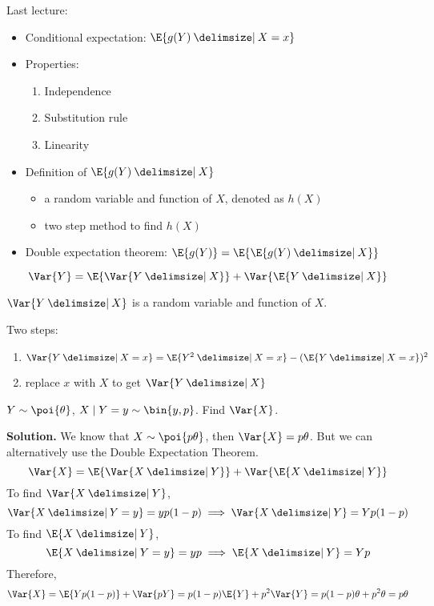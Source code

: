 Last lecture:
\begin{itemize}
    \item Conditional expectation: $ \E{g(Y)\given X=x} $
    \item Properties:
          \begin{enumerate}[label=(\arabic*)]
              \item Independence
              \item Substitution rule
              \item Linearity
          \end{enumerate}
    \item Definition of $ \E{g(Y)\given X} $
          \begin{itemize}
              \item a random variable and function of $ X $, denoted as $ h(X) $
              \item two step method to find $ h(X) $
          \end{itemize}
    \item Double expectation theorem: $ \E{g(Y)}=\E{\E{g(Y)\given X}} $
\end{itemize}
\begin{Theorem}{}{}
    \[ \Var{Y}=\E{\Var{Y\given X}}+\Var{\E{Y\given X}} \]
\end{Theorem}
\begin{Remark}{}{}
    $ \Var{Y\given X} $ is a random variable and function of $ X $.
\end{Remark}
Two steps:
\begin{enumerate}
    \item $ \Var{Y\given X=x}=\E{Y^2\given X=x}-(\E{Y\given X=x})^2 $
    \item replace $ x $ with $ X $ to get $ \Var{Y\given X} $
\end{enumerate}
\begin{Example}{}{}
    $ Y \sim \poi{\theta} $, $ X\mid Y=y \sim \bin{y,p} $. Find
    $ \Var{X} $.

    \textbf{Solution.} We know that $ X \sim \poi{p\theta} $,
    then $ \Var{X}=p\theta $. But we can alternatively
    use the Double Expectation Theorem.
    \[ \Var{X}=\E{\Var{X\given Y}}+\Var{\E{X\given Y}} \]
    To find $ \Var{X\given Y} $,
    \[ \Var{X\given Y=y}=yp(1-p)\implies \Var{X\given Y}=Yp(1-p) \]
    To find $ \E{X\given Y} $,
    \[ \E{X\given Y=y}=yp\implies \E{X\given Y}=Yp \]
    Therefore,
    \[ \Var{X}=\E{Yp(1-p)}+\Var{pY}=p(1-p)\E{Y}+p^2\Var{Y}=
        p(1-p)\theta+p^2\theta=p\theta \]
\end{Example}

